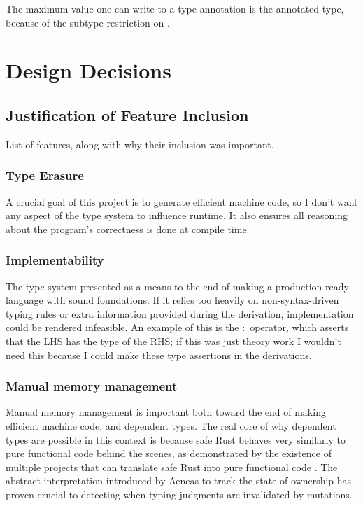\documentclass[12pt,twoside]{report}
\begin{document}
The maximum value one can write to a type annotation is the annotated type, because of the subtype restriction on .

\section{Design Decisions}
\label{section:designdecisions}

\subsection{Justification of Feature Inclusion}
List of features, along with why their inclusion was important.

\subsubsection{Type Erasure}
A crucial goal of this project is to generate efficient machine code, so I don't want any aspect of the type system to influence runtime. It also ensures all reasoning about the program's correctness is done at compile time.

\subsubsection{Implementability}
The type system presented as a means to the end of making a production-ready language with sound foundations. If it relies too heavily on non-syntax-driven typing rules or extra information provided during the derivation, implementation could be rendered infeasible. An example of this is the $:$ operator, which asserts that the LHS has the type of the RHS; if this was just theory work I wouldn't need this because I could make these type assertions in the derivations.

\subsubsection{Manual memory management}
Manual memory management is important both toward the end of making efficient machine code, and dependent types. The real core of why dependent types are possible in this context is because safe Rust behaves very similarly to pure functional code behind the scenes, as demonstrated by the existence of multiple projects that can translate safe Rust into pure functional code \citep{aeneas}\citep{ullrichKhaElectrolysis2024}. The abstract interpretation introduced by Aeneas to track the state of ownership has proven crucial to detecting when typing judgments are invalidated by mutations.
\end{document}
